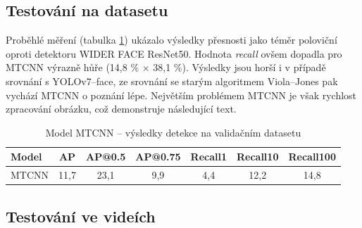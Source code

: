\subsection*{Testování na datasetu}
Proběhlé měření (tabulka \ref{tabulka:mtcnn}) ukázalo výsledky přesnosti jako téměr poloviční oproti detektoru WIDER FACE ResNet50. Hodnota \emph{recall} ovšem dopadla pro MTCNN výrazně hůře (14,8 \% $\times$ 38,1 \%). Výsledky jsou horší i v případě srovnání s YOLOv7--face, ze srovnání se starým algoritmem Viola--Jones pak vychází MTCNN o poznání lépe. Největším problémem MTCNN je však rychlost zpracování obrázku, což demonstruje následující text.

\begin{table}[H]
  \begin{center}
    \begin{tabular}{|l|c|c|c|c|c|c|}
    \hline
    \rowcolor[HTML]{E0DBDB} 
    \textbf{Model}                & \textbf{AP} & \textbf{AP@0.5} & \textbf{AP@0.75} & \textbf{Recall1} & \textbf{Recall10} & \textbf{Recall100} \\ \hline
    \cellcolor[HTML]{E0DBDB}MTCNN & 11,7        & 23,1            & 9,9              & 4,4              & 12,2              & 14,8               \\ \hline
    \end{tabular}
    \label{tabulka:mtcnn}
    \caption{Model MTCNN -- výsledky detekce na validačním datasetu}
  \end{center}
\end{table}

\subsection*{Testování ve videích}


